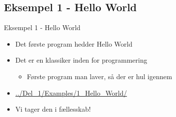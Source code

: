 \documentclass{beamer}
\begin{document}
\subsection{Eksempel 1 - Hello World}
\begin{frame}{Eksempel 1 - Hello World}
	\begin{itemize}
	\item{Det første program hedder Hello World}
	\item{Det er en klassiker inden for programmering}
		\begin{itemize}
		\item{Første program man laver, så der er hul igennem}
		\end{itemize}
	\item{\href{https://github.com/Iakop/C-Programmering-for-begyndere/tree/master/Del_1/Examples/1_Hello_World/}{../Del\_1/Examples/1\_Hello\_World/}}
	\item{Vi tager den i fællesskab!}
	\end{itemize}
\end{frame}

\end{document}
